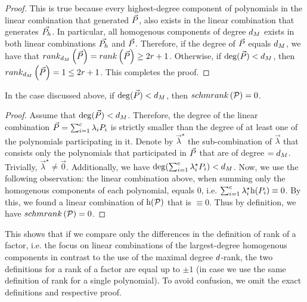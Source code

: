 \begin{remark}
\begin{proof}
        This is true because every highest-degree component of polynomials in the linear combination that generated $\vec{\genpoly}$,
        also exists in the linear combination that generates $\vec{\genpoly_h}$.
        In particular, all homogenous components of degree $d_M$ exists in both linear combinations $\vec{\genpoly_h}$ and $\vec{\genpoly}$.
        Therefore, if the degree of $\vec{\genpoly}$ equals $d_M$, we have that $\drank{\degree_M}{\vec{\genpoly}} = \rank{\vec{\genpoly}} \geq 2 \rankval + 1$.
        Otherwise, if $\deg(\vec{\genpoly}) < \degree_M$, then $\drank{\degree_M}{\vec{\genpoly}} = 1 \leq 2 \rankval + 1$.
        This completes the proof.
        \newline
    \end{proof}
\end{remark}
\begin{note*}
    In the case discussed above, if $\deg(\vec{\genpoly}) < \degree_M$, then $\schmrank{\genpolyset} = 0$.
    \begin{proof}
        Assume that $\deg(\vec{\genpoly}) < \degree_M$.
        Therefore, the degree of the linear combination $\vec{\genpoly} = \sum_{i=1}^{c} {\lambda_i \genpoly_i}$ is strictly smaller than the degree of at least one of the polynomials participating in it.
        Denote by $\vec{\lambda}^\star$ the sub-combination of $\vec{\lambda}$ that consists only the polynomials that participated in $\vec{\genpoly}$ that are of degree $= d_M$.
        Trivially, $\vec{\lambda}^\star \neq \vec{0}$.
        Additionally, we have $\deg(\sum_{i=1}^{c} {\lambda_i^\star \genpoly_i}) < \degree_M$.
        Now, we use the following observation: the linear combination above, when summing only the homogenous components of each polynomial, equals $0$, i.e. $\sum_{i=1}^{c} {\lambda_i^\star \homopart{\genpoly_i}} \equiv 0$.
        By this, we found a linear combination of $\homopart{\genpolyset}$ that is $\equiv 0$.
        Thus by definition, we have $\schmrank{\genpolyset} = 0$.
    \end{proof}
\end{note*}
\begin{note*}
    This shows that if we compare only the differences in the definition of rank of a factor, i.e. the focus on linear combinations of the largest-degree homogenous components in contrast to the use of the maximal degree $d$-rank,
    the two definitions for a rank of a factor are equal up to $\pm 1$
    (in case we use the same definition of rank for a single polynomial).
    To avoid confusion, we omit the exact definitions and respective proof.
\end{note*}

